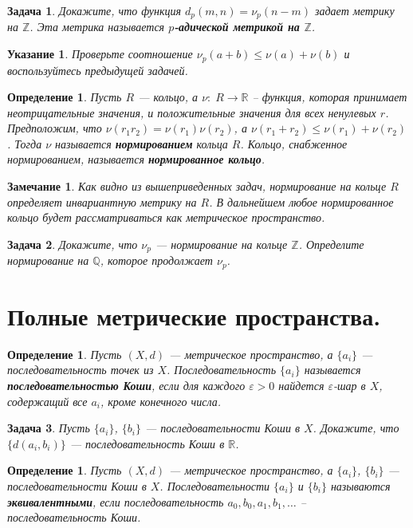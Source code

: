 \documentclass[12pt]{book}
\newcommand{\subs}{\section}
\renewcommand{\epsilon}{\varepsilon}
\def\Z{{\mathbb Z}}
\def\R{{\mathbb R}}
\def\Q{{\mathbb Q}}
\theoremstyle{upshape}
\newtheorem{zadacha}{Задача}[chapter]
\theoremstyle{generic}
\newtheorem{opredelenie}[teorema]{Определение}
\theoremstyle{upshapenonumber}
\newtheorem{ukazanie}{Указание}[section]
\newtheorem{zamechanie}{Замечание}[chapter]
\newcommand{\следствие}{%
     \refstepcounter{teorema}
     {\noindent\bf Следствие \thechapter.\arabic{teorema}:\ }}
\newcommand{\пример}{%
     \refstepcounter{teorema}
     {\noindent\bf Пример \thechapter.\arabic{teorema}:\ }}
\newcommand{\лемма}{%
     \refstepcounter{teorema}
     {\noindent\bf Лемма \thechapter.\arabic{teorema}:\ }}
\newcommand{\теорема}{%
     \refstepcounter{teorema}
     {\noindent\bf Теорема \thechapter.\arabic{teorema}:\ }}
\newcommand{\утверждение}{%
     \refstepcounter{teorema}
     {\noindent\bf Утверждение \thechapter.\arabic{teorema}:\ }}
\begin{document}
{\begin{zadacha} Докажите, что функция $d_p(m, n) = \nu_p(n-m)$
задает метрику на $\Z$. Эта метрика называется {\bf $p$-адической
метрикой на $\Z$}.
\end{zadacha}

\begin{ukazanie} Проверьте соотношение $\nu_p(a+b) \leq \nu(a) +
\nu(b)$ и воспользуйтесь предыдущей задачей.
\end{ukazanie}

\begin{opredelenie} Пусть $R$ --- кольцо, а $\nu:\; R \to \R$ --
функция, которая принимает неотрицательные значения, и положительные
значения для всех ненулевых $r$. Предположим, что $\nu(r_1 r_2) =
\nu(r_1) \nu(r_2)$, а $\nu(r_1+r_2) \leq \nu(r_1) + \nu(r_2)$.
Тогда $\nu$ называется {\bf нормированием} кольца $R$. Кольцо,
снабженное нормированием, называется {\bf нормированное кольцо}.
\end{opredelenie}

\begin{zamechanie} Как видно из вышеприведенных задач,
нормирование на кольце $R$ определяет инвариантную метрику на $R$. В
дальнейшем любое нормированное кольцо будет рассматриваться как
метрическое пространство.
\end{zamechanie}

\begin{zadacha} Докажите, что $\nu_p$ --- нормирование на
кольце $\Z$. Определите нормирование на $\Q$, которое продолжает $\nu_p$.
\end{zadacha}

\subs{{Полные метрические пространства.}}

\begin{opredelenie} Пусть $(X, d)$ --- метрическое
пространство, а $\{a_i\}$ --- последовательность точек из
$X$. Последовательность $\{a_i\}$ называется {\bf
последовательностью Коши}, если для каждого $\epsilon>0$ найдется
$\epsilon$-шар в $X$, содержащий все $a_i$, кроме конечного числа.
\end{opredelenie}

\begin{zadacha} Пусть $\{a_i\}$, $\{b_i\}$ --- последовательности
Коши в $X$. Докажите, что $\{ d(a_i, b_i)\}$ --- последовательность
Коши в $\R$.
\end{zadacha}

\begin{opredelenie} Пусть $(X, d)$ --- метрическое
пространство, а $\{a_i\}$, $\{b_i\}$ --- последовательности Коши в
$X$. Последовательности $\{a_i\}$ и $\{b_i\}$ называются {\bf
эквивалентными}, если последовательность $a_0, b_0, a_1, b_1,\ldots$
-- последовательность Коши.
\end{opredelenie}

}
\end{document}
